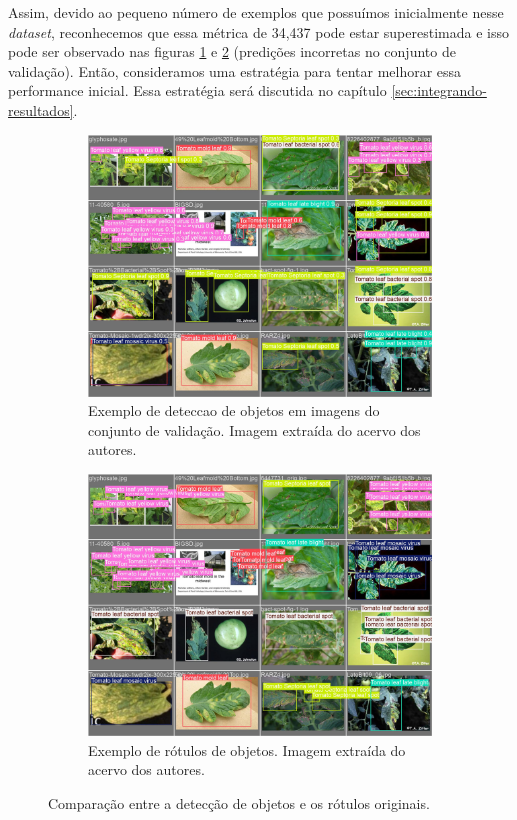 Assim, devido ao pequeno número de exemplos que possuímos inicialmente nesse \emph{dataset}, reconhecemos que essa métrica de 34,437 pode estar superestimada e isso pode ser observado nas figuras \ref{fig:val-pred} e \ref{fig:val-labels} (predições incorretas no conjunto de validação). Então, consideramos uma estratégia para tentar melhorar essa performance inicial. Essa estratégia será discutida no capítulo \ref{sec:integrando-resultados}.
\begin{figure}[H]
    \centering
    \begin{subfigure}[t]{0.45\textwidth}
        \centering
        \includegraphics[width=\textwidth]{images/val_batch0_pred.jpg}
        \caption{Exemplo de deteccao de objetos em imagens do conjunto de validação. Imagem extraída do acervo dos autores.}
        \label{fig:val-pred} 
    \end{subfigure}\hfill
    \begin{subfigure}[t]{0.45\textwidth}
        \centering
        \includegraphics[width=\textwidth]{images/val_batch0_labels.jpg}
        \caption{Exemplo de rótulos de objetos. Imagem extraída do acervo dos autores.}
        \label{fig:val-labels}
    \end{subfigure}
    \caption{Comparação entre a detecção de objetos e os rótulos originais.}
    \label{fig:comparison}
\end{figure}
